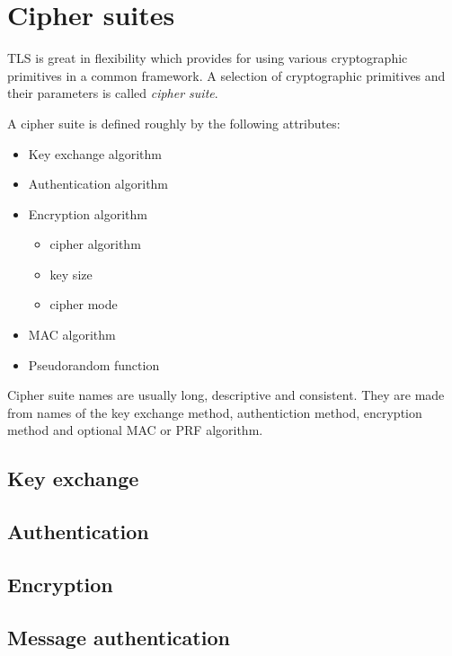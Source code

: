 \section{Cipher suites}

TLS is great in flexibility which provides for using various cryptographic primitives in a common framework. A selection of cryptographic primitives and their parameters is called \textit{cipher suite}.

A cipher suite is defined roughly by the following attributes:

\begin{itemize}
  \item Key exchange algorithm
  \item Authentication algorithm
  \item Encryption algorithm
  \begin{itemize}
    \item cipher algorithm
    \item key size
    \item cipher mode
  \end{itemize}
  \item MAC algorithm
  \item Pseudorandom function
\end{itemize}

Cipher suite names are usually long, descriptive and consistent. They are made from names of the key exchange method, authentiction method, encryption method and optional MAC or PRF algorithm.



\subsection{Key exchange}

\subsection{Authentication}

\subsection{Encryption}

\subsection{Message authentication}
